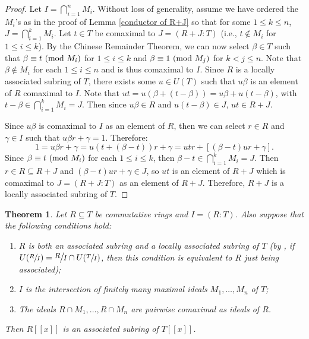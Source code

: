\documentclass[12pt]{amsart}
\newtheorem{theorem}{Theorem}[section]
\theoremstyle{definition}
\newcommand{\modulo}[1]{\textup{ (mod }#1)}
\newcommand{\quot}[2]{\large\sfrac{#1}{#2}\normalsize}
\begin{document}
\begin{proof}
    Let $I=\bigcap_{i=1}^n M_i$. Without loss of generality, assume we have ordered the $M_i$'s as in the proof of Lemma \ref{conductor of R+J} so that for some $1\leq k\leq n$, $J=\bigcap_{i=1}^k M_i$. Let $t\in T$ be comaximal to $J=(R+J:T)$ (i.e., $t\notin M_i$ for $1\leq i\leq k$). By the Chinese Remainder Theorem, we can now select $\beta\in T$ such that $\beta\equiv t\modulo{M_i}$ for $1\leq i\leq k$ and $\beta\equiv 1\modulo{M_j}$ for $k<j\leq n$. Note that $\beta\notin M_i$ for each $1\leq i\leq n$ and is thus comaximal to $I$. Since $R$ is a locally associated subring of $T$, there exists some $u\in U(T)$ such that $u\beta$ is an element of $R$ comaximal to $I$. Note that $ut=u(\beta+(t-\beta))=u\beta+u(t-\beta)$, with $t-\beta\in \bigcap_{i=1}^k M_i=J$. Then since $u\beta\in R$ and $u(t-\beta)\in J$, $ut\in R+J$.
    
    Since $u\beta$ is comaximal to $I$ as an element of $R$, then we can select $r\in R$ and $\gamma\in I$ such that $u\beta r+\gamma=1$. Therefore:
    $$1=u\beta r+\gamma=u(t+(\beta-t))r+\gamma=utr+[(\beta-t)ur+\gamma].$$
    Since $\beta\equiv t\modulo{M_i}$ for each $1\leq i\leq k$, then $\beta-t\in \bigcap_{i=1}^k M_i=J$. Then $r\in R\subseteq R+J$ and $(\beta-t)ur+\gamma\in J$, so $ut$ is an element of $R+J$ which is comaximal to $J=(R+J:T)$ as an element of $R+J$. Therefore, $R+J$ is a locally associated subring of $T$.
\end{proof}

\begin{theorem}
    \label{associated ps sufficient}
    Let $R\subseteq T$ be commutative rings and $I=(R:T)$. Also suppose that the following conditions hold:
    \begin{enumerate}
        \item $R$ is both an associated subring and a locally associated subring of $T$ (by \cite[Theorem 2.11]{subringrelations}, if $U(\sfrac{R}{I})=\quot{R}{I}\cap U(\sfrac{T}{I})$, then this condition is equivalent to $R$ just being associated);
        \item $I$ is the intersection of finitely many maximal ideals $M_1,\dots,M_n$ of $T$;
        \item The ideals $R\cap M_1,\dots,R\cap M_n$ are pairwise comaximal as ideals of $R$.
    \end{enumerate}
    Then $R[[x]]$ is an associated subring of $T[[x]]$.
\end{theorem}
\end{document}
